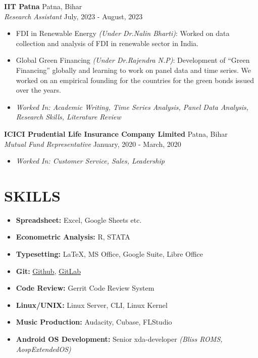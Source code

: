 \documentclass[a4paper,9pt]{extarticle}
\begin{document}
	\noindent
	\textbf{IIT Patna} \hfill Patna, Bihar\\ %
	\textit{Research Assistant} \hfill July, 2023 - August, 2023 %
	\begin{itemize} %
		\item FDI in Renewable Energy \textit{(Under Dr.Nalin Bharti)}: Worked on data collection and analysis of FDI in renewable sector in India.  
		\item Global Green Financing \textit{(Under Dr.Rajendra N.P)}: Development of \enquote{Green Financing} globally and learning to work on panel data and time series. We worked on an empirical founding for the countries for the green bonds issued over the years.
		\item \textit{Worked In: Academic Writing, Time Series Analysis, Panel Data Analysis, Research Skills, Literature Review}
	\end{itemize}
	
	\noindent
	\textbf{ICICI Prudential Life Insurance Company Limited} \hfill Patna, Bihar \\ %
	\textit{Mutual Fund Representative} \hfill January, 2020 - March, 2020 %
	\begin{itemize} %
		\item \textit{Worked In: Customer Service, Sales, Leadership}    
	\end{itemize}
	
	\section*{SKILLS}
	\begin{itemize}
		\item \textbf{Spreadsheet:} Excel, Google Sheets etc.
		\item \textbf{Econometric Analysis:} R, STATA
		\item \textbf{Typesetting: } \LaTeX, MS Office, Google Suite, Libre Office
		\item \textbf{Git:} \href{https://github.com/AmolAmrit}{Github}, \href{https://gitlab.com/AmolAmrit}{GitLab}
		\item \textbf{Code Review: } Gerrit Code Review System
		\item \textbf{Linux/UNIX:} Linux Server, CLI, Linux Kernel
		\item \textbf{Music Production: } Audacity, Cubase, FLStudio
		\item \textbf{Android OS Development:} Senior xda-developer \textit{(Bliss ROMS, AospExtendedOS)}
	\end{itemize}
	
\end{document}
